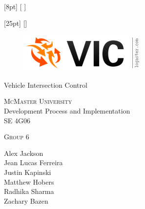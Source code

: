 \documentclass [12pt]{article}
\begin{document}

[8pt]                                               %
{}%
{\contentsmargin{2pt}                               %
     \thecontentslabel {\enspace }  %
    }
{\contentsmargin{0pt}\Large}                        %
{\contentspage} %
[ ] %

[25pt]                                               %
{}%
{\contentsmargin{0pt}                               %
    \thecontentslabel\enspace\enspace%
    }
{\contentsmargin{4pt}\large}                        %
{\contentspage} %
[] %




\begin {center} 
	
	\thispagestyle{empty}
	\vspace*{4.5cm}


	
	\begin {figure}[h!]
		\centering
		\includegraphics [scale = .5, trim={.4cm 0 .8cm 0},clip] {figures/vic_logo.png}
	\end {figure}

	{\fontfamily{\cabinfamily}\selectfont
	\Huge{Vehicle Intersection Control} }
	
	\vspace{1 cm}
	{\LARGE{\textsc{McMaster University}}\\}  \vspace {1cm}
	{\Large Development Process and Implementation\\ \vspace {0.5 cm} SE 4G06}  \vspace {1cm}

		{\large \textsc{Group 6} \\} \vspace{1cm}

	{
		Alex Jackson \\
		Jean Lucas Ferreira \\
		Justin Kapinski\\
		Matthew Hobers\\
		Radhika Sharma\\
		Zachary Bazen}

	

		
	\end{center}
	
\end{document}

